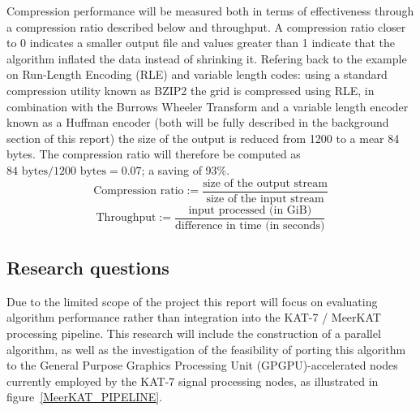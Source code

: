 Compression performance will be measured both in terms of effectiveness through a compression ratio described below \cite[p. 10]{salomon2004data} and throughput. A 
compression ratio closer to 0 indicates a smaller output file and values greater than 1 indicate that the algorithm inflated the data instead of shrinking it. Refering
back to the example on Run-Length Encoding (RLE) and variable length codes: using a standard compression utility known as BZIP2 the grid is compressed using RLE, in combination 
with the Burrows Wheeler Transform and a variable length encoder known as a Huffman encoder (both will be fully described in the background section of this report) the size 
of the output is reduced from 1200 to a mear 84 bytes. The compression ratio will therefore be computed as $84 \text{ bytes} / 1200 \text{ bytes} = 0.07$; a saving of 93\%. 
\begin{equation}
 \text{Compression ratio} := \frac{\text{size of the output stream}}{\text{size of the input stream}}
\end{equation}
\begin{equation}
 \text{Throughput} := \frac{\text{input processed (in GiB)}}{\text{difference in time (in seconds)}}
\end{equation}
\subsection{Research questions}
Due to the limited scope of the project this report will focus on evaluating algorithm performance rather than integration into the KAT-7 / MeerKAT processing
pipeline. This research will include the construction of a parallel algorithm, as well as the investigation of the feasibility of porting this algorithm to the General 
Purpose Graphics Processing Unit (GPGPU)-accelerated nodes currently employed by the KAT-7 signal processing nodes, as illustrated in figure~\ref{MeerKAT_PIPELINE}.

